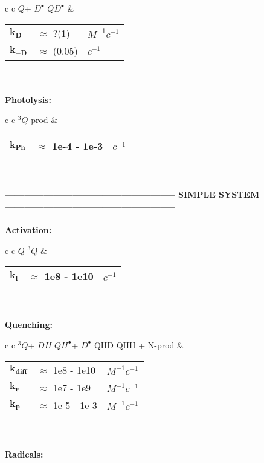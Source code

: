 \documentclass{article}
\def\QH{$QH^{\bullet }$}
\def\D{$D^{\bullet }$}
\def\Q{$Q$}
\def\Qt{$^{3}Q$}
\def\DH{$DH$}
\def\QD{$QD^{\bullet }$}
\begin{document}
\begin{tabular}{ c c }
    \schemestart
    \Q + \D
    \arrow{<=>[$k_{D}$][$k_{-D}$]}
    \QD
    \schemestop
     & \begin{tabular}{ l l l }
           $\mathbf{k_{D}}$  & $\approx$ ?(1)   & $M^{-1}c^{-1}$ \\
           $\mathbf{k_{-D}}$ & $\approx$ (0.05) & $c^{-1}$       \\\hline
       \end{tabular}
    \vspace{1.5mm}
\end{tabular}
\vspace{1.5mm}
\\
\\
\textbf{Photolysis:}
\begin{tabular}{ c c }
    \schemestart
    \Qt
    \arrow{->[$k_{Ph}$]}
    prod
    \schemestop
     & \begin{tabular}{ l l l }
           $\mathbf{k_{Ph}}$ & $\approx$ 1e-4 - 1e-3 & $c^{-1}$ \\\hline
       \end{tabular}
    \vspace{1.5mm}
\end{tabular}
\vspace{1.5mm}
\\
\\
\textbf{----------------------------------------------------- SIMPLE SYSTEM -----------------------------------------------------}
\\
\\
\textbf{Activation:}
\begin{tabular}{ c c }
    \schemestart
    \Q
    \arrow{->[$h\nu$, $k_l$]}
    \Qt
    \schemestop
     & \begin{tabular}{ l l l }
           $\mathbf{k_l}$ & $\approx$ 1e8 - 1e10 & $c^{-1}$ \\\hline
       \end{tabular}
    \vspace{1.5mm}
\end{tabular}
\vspace{1.5mm}
\\
\\
\textbf{Quenching:}
\begin{tabular}{ c c }
    \schemestart
    \Qt + \DH
    \arrow{->[$k_{diff}$]}
    \QH + \D
    \arrow{->[$k_r$]}
    QHD
    \arrow{->[$k_p$]}
    QHH + N-prod
    \schemestop
     & \begin{tabular}{ l l l }
           $\mathbf{k_{diff}}$ & $\approx$ 1e8 - 1e10  & $M^{-1}c^{-1}$ \\
           $\mathbf{k_r}$      & $\approx$ 1e7 - 1e9   & $M^{-1}c^{-1}$ \\
           $\mathbf{k_p}$      & $\approx$ 1e-5 - 1e-3 & $M^{-1}c^{-1}$ \\\hline
       \end{tabular}
    \vspace{1.5mm}
\end{tabular}
\vspace{1.5mm}
\\
\\
\textbf{Radicals:}
\end{document}

